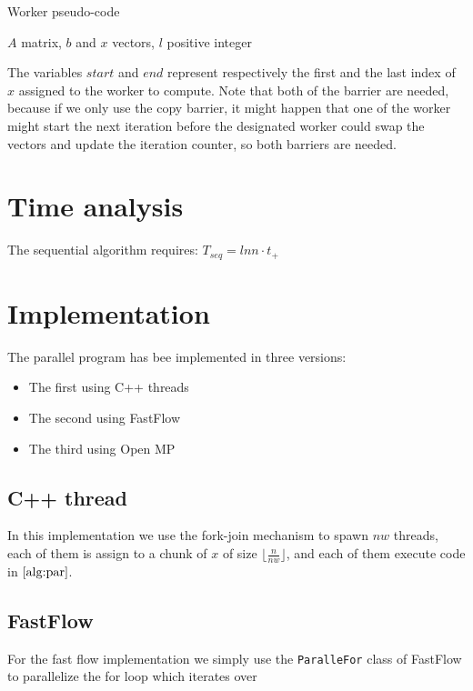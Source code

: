 \documentclass[12pt]{article}
\begin{document}
	
	\begin{algorithm}[H]
		\caption{Worker pseudo-code}\label{alg:par}
		\begin{algorithmic}[1]
			\Require $A$ matrix, $b$ and $x$ vectors, $l$ positive integer
			\EndIf
			\EndFor
			\EndFor
			\EndIf
			\EndWhile
		\end{algorithmic}
	\end{algorithm}
	The variables $start$ and $end$ represent respectively the first and the last index of $x$ assigned to the worker to compute. Note that both of the barrier are needed, because if we only use the copy barrier, it might happen that one of the worker might start the next iteration before the designated worker could swap the vectors and update the iteration counter, so both barriers are needed. 
	
	\section{Time analysis}
	The sequential algorithm requires:
	$T_{seq} = lnn\cdot t_+$
	
	\section{Implementation}
	The parallel program has bee implemented in three versions:
	\begin{itemize}
		\item The first using C++ threads 
		\item The second using FastFlow
		\item The third using Open MP
	\end{itemize}
	\subsection{C++ thread}
	In this implementation we use the fork-join mechanism to spawn $nw$ threads, each of them is assign to a chunk of $x$ of size $\lfloor\frac{n}{nw}\rfloor$, and each of them execute code in $\ref{alg:par}$.
	\subsection{FastFlow}
	For the fast flow implementation we simply use the \verb|ParalleFor| class of FastFlow to parallelize the for loop which iterates over 
	
\end{document}
